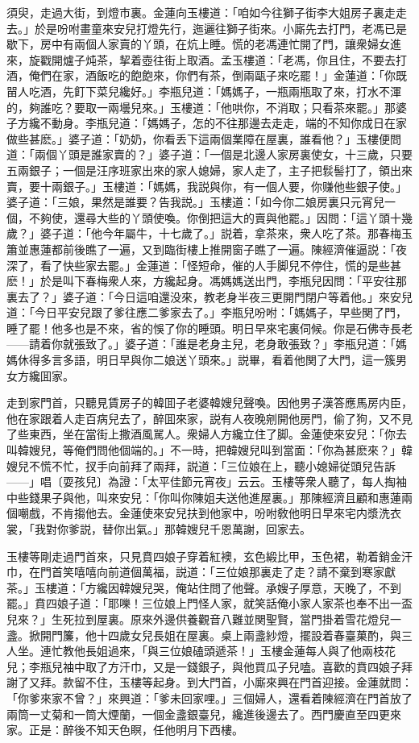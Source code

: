 須臾，走過大街，到燈市裏。金蓮向玉樓道：「咱如今往獅子街李大姐房子裏走走去。」於是吩咐畫童來安兒打燈先行，迤邐往獅子街來。小廝先去打門，老馮已是歇下，房中有兩個人家賣的丫頭，在炕上睡。慌的老馮連忙開了門，讓衆婦女進來，旋戳開爐子炖茶，挈着壺往街上取酒。孟玉樓道：「老馮，你且住，不要去打酒，俺們在家，酒飯吃的飽飽來，你們有茶，倒兩甌子來吃罷！」金蓮道：「你既㽞人吃酒，先飣下菜兒纔好。」李瓶兒道：「媽媽子，一瓶兩瓶取了來，打水不渾的，夠誰吃？要取一兩壜兒來。」玉樓道：「他哄你，不消取；只看茶來罷。」那婆子方纔不動身。李瓶兒道：「媽媽子，怎的不往那邊去走走，端的不知你成日在家做些甚麽。」婆子道：「奶奶，你看丢下這兩個業障在屋裏，誰看他？」玉樓便問道：「兩個丫頭是誰家賣的？」婆子道：「一個是北邊人家房裏使女，十三歲，只要五兩銀子；一個是汪序班家出來的家人媳婦，家人走了，主子把䯼髻打了，領出來賣，要十兩銀子。」玉樓道：「媽媽，我説與你，有一個人要，你赚他些銀子使。」婆子道：「三娘，果然是誰要？告我説。」玉樓道：「如今你二娘房裏只元宵兒一個，不夠使，還尋大些的丫頭使喚。你倒把這大的賣與他罷。」因問：「這丫頭十幾歲？」婆子道：「他今年屬牛，十七歲了。」説着，拿茶來，衆人吃了茶。那春梅玉簫並惠蓮都前後瞧了一遍，又到臨街樓上推開窗子瞧了一遍。陳經濟催逼説：「夜深了，看了快些家去罷。」金蓮道：「怪短命，催的人手脚兒不停住，慌的是些甚麽！」於是叫下春梅衆人來，方纔起身。馮媽媽送出門，李瓶兒因問：「平安往那裏去了？」婆子道：「今日這咱還没來，教老身半夜三更開門閉户等着他。」來安兒道：「今日平安兒跟了爹往應二爹家去了。」李瓶兒吩咐：「媽媽子，早些関了門，睡了罷！他多也是不來，省的悞了你的睡頭。明日早來宅裏伺候。你是石佛寺長老——請着你就張致了。」婆子道：「誰是老身主兒，老身敢張致？」李瓶兒道：「媽媽休得多言多語，明日早與你二娘送丫頭來。」説畢，看着他関了大門，這一簇男女方纔囬家。

走到家門首，只聽見賃房子的韓囬子老婆韓嫂兒聲喚。因他男子漢答應馬房内臣，他在家跟着人走百病兒去了，醉囬來家，説有人夜晚剜開他房門，偷了狗，又不見了些東西，坐在當街上撒酒風駡人。衆婦人方纔立住了脚。金蓮使來安兒：「你去叫韓嫂兒，等俺們問他個端的。」不一時，把韓嫂兒叫到當面：「你為甚麽來？」韓嫂兒不慌不忙，扠手向前拜了兩拜，説道：「三位娘在上，聽小媳婦従頭兒告訴——」唱〔耍孩兒〕為證：「太平佳節元宵夜」云云。玉樓等衆人聽了，每人掏袖中些錢果子與他，叫來安兒：「你叫你陳姐夫送他進屋裏。」那陳經濟且顧和惠蓮兩個嘲戲，不肯搊他去。金蓮使來安兒扶到他家中，吩咐敎他明日早來宅内漿洗衣裳，「我對你爹説，替你出氣。」那韓嫂兒千恩萬謝，回家去。

玉樓等剛走過門首來，只見賁四娘子穿着紅襖，玄色緞比甲，玉色裙，勒着銷金汗巾，在門首笑嘻嘻向前道個萬福，説道：「三位娘那裏走了走？請不棄到寒家獻茶。」玉樓道：「方纔因韓嫂兒哭，俺站住問了他聲。承嫂子厚意，天晚了，不到罷。」賁四娘子道：「耶嚛！三位娘上門怪人家，就笑話俺小家人家茶也奉不出一盃兒來？」生死拉到屋裏。原來外邊供養觀音八難並関聖賢，當門掛着雪花燈兒一盞。掀開門簾，他十四歲女兒長姐在屋裏。桌上兩盞紗燈，擺設着春臺菓酌，與三人坐。連忙教他長姐過來，「與三位娘磕頭遞茶！」玉樓金蓮每人與了他兩枝花兒；李瓶兒袖中取了方汗巾，又是一錢銀子，與他買瓜子兒嗑。喜歡的賁四娘子拜謝了又拜。款留不住，玉樓等起身。到大門首，小廝來興在門首迎接。金蓮就問：「你爹來家不曾？」來興道：「爹未回家哩。」三個婦人，還看着陳經濟在門首放了兩筒一丈菊和一筒大煙蘭，一個金盞銀臺兒，纔進後邊去了。西門慶直至四更來家。正是：醉後不知天色瞑，任他明月下西樓。

